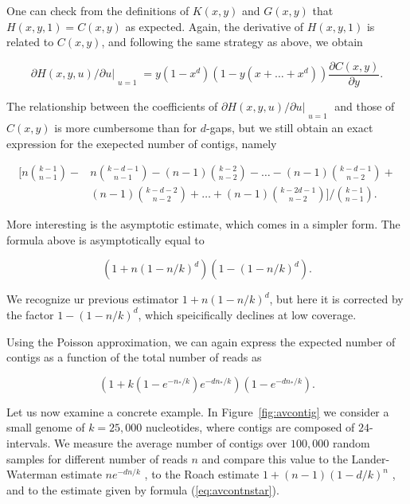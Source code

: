 \documentclass{article}
\begin{document}
One can check from the definitions of $K(x,y)$ and $G(x,y)$ that $H(x,y,1)
= C(x,y)$ as expected. Again, the derivative of $H(x,y,1)$ is related to
$C(x,y)$, and following the same strategy as above, we obtain

\begin{equation*}
\partial H(x,y,u)/\partial u|_{\substack{\\u=1}}
= y(1-x^d)\left( 1 - y(x+\ldots+x^d) \right)
\frac{\partial C(x,y)}{\partial y}.
\end{equation*}

The relationship between the coefficients of $\partial H(x,y,u) /\partial
u|_{\substack{\\u=1}}$ and those of $C(x,y)$ is more cumbersome than for
$d$-gaps, but we still obtain an exact expression for the exepected number
of contigs, namely

\begin{equation*}
\begin{split}
\Bigg[ n{k-1 \choose n-1} - &n{k-d-1 \choose n-1} -
(n-1){k-2 \choose n-2} - \ldots - (n-1) {k-d-1 \choose n-2} +
\\ &(n-1){k-d-2 \choose n-2} +
\ldots + (n-1){k-2d-1 \choose n-2} \Bigg] \Big/ {k-1 \choose n-1}.
\end{split}
\end{equation*}

More interesting is the asymptotic estimate, which comes in a
simpler form. The formula above is asymptotically equal to

\begin{equation}
\label{eq:avcont}
\left( 1+n(1-n/k)^d \right) \left(1-(1-n/k)^d\right).
\end{equation}

We recognize ur previous estimator
$1+n(1-n/k)^d$, but here it is corrected by the factor $1-(1-n/k)^d$,
which speicifically declines at low coverage.

Using the Poisson approximation, we can again express the expected number
of contigs as a function of the total number of reads as

\begin{equation}
\label{eq:avcontnstar}
(1 + k(1-e^{-n_*/k})e^{-dn_*/k} ) (1-e^{-dn_*/k}).
\end{equation}

Let us now examine a concrete example. In Figure~\ref{fig:avcontig} we
consider a small genome of $k = 25,000$ nucleotides, where contigs are
composed of $24$-intervals. We measure the average number of contigs over
$100,000$ random samples for different number of reads $n$ and compare
this value to the Lander-Waterman estimate $ne^{-dn/k}$
\cite{pmid3294162}, to the Roach estimate $1+(n-1)(1-d/k)^n$
\cite{pmid8808467}, and to the estimate given by formula
(\ref{eq:avcontnstar}).
\end{document}
